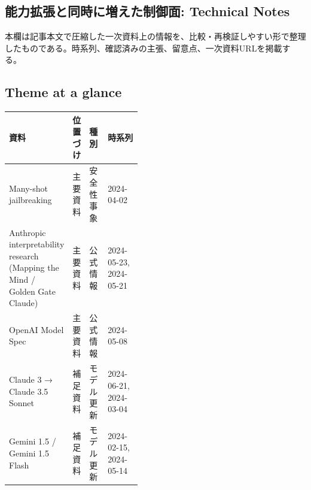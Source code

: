 \subsection*{能力拡張と同時に増えた制御面: Technical Notes}
本欄は記事本文で圧縮した一次資料上の情報を、比較・再検証しやすい形で整理したものである。時系列、確認済みの主張、留意点、一次資料URLを掲載する。
\medskip
\subsection*{Theme at a glance}
\begin{center}
\footnotesize
\begin{tabularx}{\linewidth}{@{}p{0.20\linewidth}p{0.10\linewidth}p{0.14\linewidth}X@{}}
\toprule
資料 & 位置づけ & 種別 & 時系列 \\
\midrule
Many-shot jailbreaking & 主要資料 & 安全性事象 & 2024-04-02   \\
Anthropic interpretability research (Mapping the Mind / Golden Gate Claude) & 主要資料 & 公式情報 & 2024-05-23, 2024-05-21   \\
OpenAI Model Spec & 主要資料 & 公式情報 & 2024-05-08   \\
Claude 3 → Claude 3.5 Sonnet & 補足資料 & モデル更新 & 2024-06-21, 2024-03-04   \\
Gemini 1.5 / Gemini 1.5 Flash & 補足資料 & モデル更新 & 2024-02-15, 2024-05-14   \\
\bottomrule
\end{tabularx}
\end{center}
\normalsize

